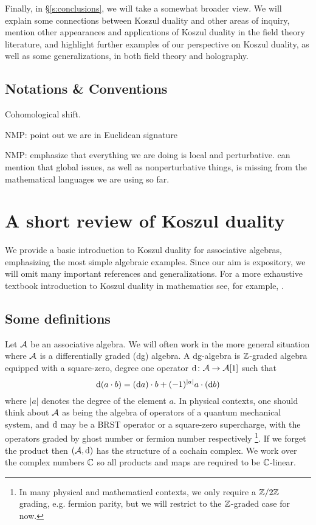 \documentclass[11pt]{amsart}
\def\natalie#1{{\textcolor{green!65!black}{NMP: {#1}}}}
\begin{document}
Finally, in \S \ref{s:conclusions}, we will take a somewhat broader view. We will explain some connections between Koszul duality and other areas of inquiry, mention other appearances and applications of Koszul duality in the field theory literature, and highlight further examples of our perspective on Koszul duality, as well as some generalizations, in both field theory and holography. 

\subsection*{Notations \& Conventions}

Cohomological shift. 

\natalie{point out we are in Euclidean signature}

\natalie{emphasize that everything we are doing is local and perturbative. can mention that global issues, as well as nonperturbative things, is missing from the mathematical languages we are using so far.}



\section{A short review of Koszul duality} \label{s:review}


We provide a basic introduction to Koszul duality for associative algebras, emphasizing the most simple algebraic examples. Since our aim is expository, we will omit many important references and generalizations. 
For a more exhaustive textbook introduction to Koszul duality in mathematics see, for example, \cite[Chapter 3]{LV}. 

\subsection{Some definitions}

Let $\mathcal A$ be an associative algebra.
We will often work in the more general situation where $\mathcal A$ is a differentially graded (dg) algebra. 
A dg-algebra is $\mathbb Z$-graded algebra equipped with a square-zero, degree one operator ${\rm d} \colon \mathcal A \to \mathcal A[1]$ such that 
\[
{\rm d} (a \cdot b) = ({\rm d} a) \cdot b + (-1)^{|a|} a \cdot ({\rm d} b) 
\]
where $|a|$ denotes the degree of the element $a$. 
In physical contexts, one should think about $\mathcal A$ as being the algebra of operators of a quantum mechanical system, and ${\rm d}$ may be a BRST operator or a square-zero supercharge, with the operators graded by ghost number or fermion number respectively \footnote{In many physical and mathematical contexts, we only require a $\mathbb Z/2\mathbb Z$ grading, e.g. fermion parity, but we will restrict to the $\mathbb Z$-graded case for now.}.
If we forget the product then $(\mathcal A, {\rm d})$ has the structure of a cochain complex. 
We work over the complex numbers $\mathbb C$ so all products and maps are required to be $\mathbb C$-linear. 
\end{document}

